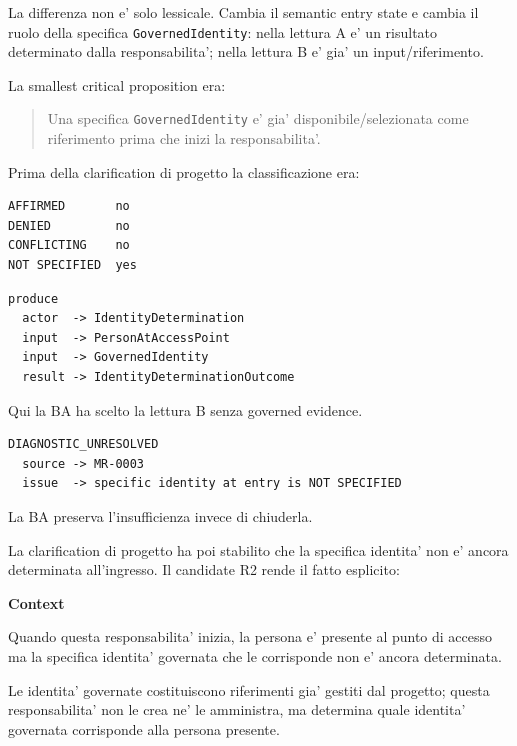 \documentclass[11pt,a4paper]{article}
\newcommand{\code}[1]{\nolinkurl{#1}}
\begin{document}
La differenza non e' solo lessicale. Cambia il semantic entry state e cambia il ruolo della specifica \code{GovernedIdentity}: nella lettura A e' un risultato determinato dalla responsabilita'; nella lettura B e' gia' un input/riferimento.

La smallest critical proposition era:

\begin{quote}
Una specifica \code{GovernedIdentity} e' gia' disponibile/selezionata come riferimento prima che inizi la responsabilita'.
\end{quote}

Prima della clarification di progetto la classificazione era:

\begin{lstlisting}
AFFIRMED       no
DENIED         no
CONFLICTING    no
NOT SPECIFIED  yes
\end{lstlisting}

\begin{badbox}
\begin{lstlisting}
produce
  actor  -> IdentityDetermination
  input  -> PersonAtAccessPoint
  input  -> GovernedIdentity
  result -> IdentityDeterminationOutcome
\end{lstlisting}
Qui la BA ha scelto la lettura B senza governed evidence.
\end{badbox}

\begin{goodbox}
\begin{lstlisting}
DIAGNOSTIC_UNRESOLVED
  source -> MR-0003
  issue  -> specific identity at entry is NOT SPECIFIED
\end{lstlisting}
La BA preserva l'insufficienza invece di chiuderla.
\end{goodbox}

La clarification di progetto ha poi stabilito che la specifica identita' non e' ancora determinata all'ingresso. Il candidate R2 rende il fatto esplicito:

\begin{sourcebox}
\textbf{Context}

Quando questa responsabilita' inizia, la persona e' presente al punto di accesso ma la specifica identita' governata che le corrisponde non e' ancora determinata.

Le identita' governate costituiscono riferimenti gia' gestiti dal progetto; questa responsabilita' non le crea ne' le amministra, ma determina quale identita' governata corrisponde alla persona presente.
\end{sourcebox}
\end{document}
